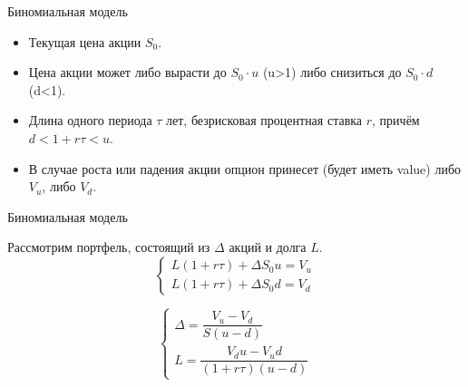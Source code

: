\documentclass{beamer}
\begin{document}
\begin{frame}{Биномиальная модель}
\centering
{}

\justify
\begin{itemize}
\item Текущая цена акции $S_0$.
\item Цена акции может либо вырасти до $S_0\cdot u$ (u>1) либо снизиться до $S_0 \cdot d$ (d<1).
\item Длина одного периода $\tau$ лет, безрисковая  процентная ставка $r$, причём $d < 1+r\tau < u$.
\item В случае роста или падения акции опцион принесет (будет иметь value) либо $V_u$, либо $V_d$.
\end{itemize}
\end{frame}



\begin{frame}{Биномиальная модель}
\centering
{}

\justify
Рассмотрим портфель, состоящий из $\Delta$ акций и долга $L$. 
\begin{equation*}
\begin{cases}
L(1+r\tau) + \Delta S_0 u = V_u \\
L(1+r\tau) + \Delta S_0 d = V_d
\end{cases}
\end{equation*}

\begin{equation*}
\begin{cases}
\Delta = \dfrac{V_u - V_d}{S(u-d)} \\
L = \dfrac{V_du - V_ud}{(1+r\tau)(u-d)}
\end{cases}
\end{equation*}
\end{frame}
\end{document}
